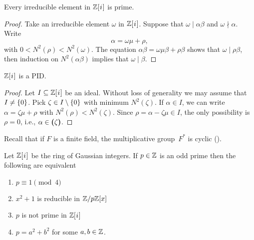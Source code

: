 \begin{cor}\label{cor:cor:gauss-irreducible-is-prime}
    Every irreducible element in $\mathbb{Z}[{\mkern1mu i\mkern1mu}]$ is prime.
\end{cor}

\begin{proof}
    Take an irreducible element $\omega$ in $\mathbb{Z}[{\mkern1mu i\mkern1mu}]$. Suppose that $\omega\mid\alpha\beta$ and $\omega\nmid\alpha$. Write
    $$
        \alpha = \omega\mu+\rho,
    $$
    with $0<N^2(\rho)<N^2(\omega)$. The equation $\alpha\beta=\omega\mu\beta+\rho\beta$ shows that $\omega\mid\rho\beta$, then induction on $N^2(\alpha\beta)$ implies that $\omega\mid\beta$.
\end{proof}

\begin{cor}\label{cor:gauss-integers-pid}
    $\mathbb{Z}[{\mkern1mu i\mkern1mu}]$ is a PID.
\end{cor}

\begin{proof}
    Let $I\subseteq\mathbb{Z}[{\mkern1mu i\mkern1mu}]$ be an ideal. Without loss of generality we may assume that $I\ne\{0\}$. Pick $\zeta\in I\setminus\{0\}$ with minimum $N^2(\zeta)$. If $\alpha\in I$, we can write $\alpha=\zeta\mu+\rho$ with $N^2(\rho)<N^2(\zeta)$. Since $\rho=\alpha-\zeta\mu\in I$, the only possibility is $\rho=0$, i.e., $\alpha\in\textrm{\boldmath$($}\zeta\textrm{\boldmath$)$}$.
\end{proof}

\begin{rem}
    Recall that if $F$ is a finite field, the multiplicative group~$F^*$ is cyclic (\citet[\S1~Preliminaries]{LC}).
\end{rem}

\begin{thm}
    Let\/ $\mathbb{Z}[{\mkern1mu i\mkern1mu}]$ be the ring of Gaussian integers. If\/ $p\in\mathbb{Z}$ is an odd prime then the following are equivalent
    \begin{enumerate}[\rm a)]
        \item $p\equiv1\pmod 4$
        \item $x^2+1$ is reducible in $\mathbb{Z}/p\mathbb{Z}[x]$
        \item $p$ is not prime in\/ $\mathbb{Z}[{\mkern1mu i\mkern1mu}]$
        \item $p=a^2+b^2$ for some $a,b\in\mathbb{Z}$.
    \end{enumerate}
\end{thm}

